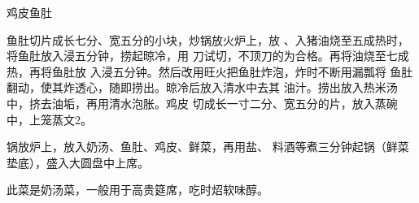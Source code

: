 \begin{recipe}{鸡皮鱼肚}

\ingredients


\cooking

\step 鱼肚切片成长七分、宽五分的小块，炒锅放火炉上，放 、入猪油烧至五成热时，将鱼肚放入浸五分钟，捞起晾冷，用 刀试切，不顶刀的为合格。再将油烧至七成热，再将鱼肚放 入浸五分钟。然后改用旺火把鱼肚炸泡，炸时不断用漏瓢将 鱼肚翻动，使其炸透心，随即捞出。晾冷后放入清水中去其 油汁。捞出放入热米汤中，挤去油垢，再用清水泡胀。鸡皮 切成长一寸二分、宽五分的片，放入蒸碗中，上笼蒸文2。

\step 锅放炉上，放入奶汤、鱼肚、鸡皮、鲜菜，再用盐、 料酒等煮三分钟起锅（鲜菜垫底），盛入大圆盘中上席。

\notes

此菜是奶汤菜，一般用于高贵筵席，吃时炤软味醇。

\end{recipe}

